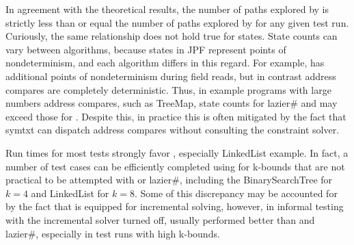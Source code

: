 In agreement with the theoretical results, the number of paths explored by \symtxt{} is strictly less than or equal the number of paths explored by \gsetxt{} for any given test run. Curiously, the same relationship does not hold true for states. State counts can vary between algorithms, because states in JPF represent points of nondeterminism, and each algorithm differs in this regard. For example, \gsetxt{} has additional points of nondeterminism during field reads, but in contrast address compares are completely deterministic. Thus, in example programs with large numbers address compares, such as TreeMap, state counts for lazier\# and \symtxt{} may exceed those for \gsetxt{}. Despite this, in practice this is often mitigated by the fact that symtxt{} can dispatch address compares without consulting the constraint solver.

Run times for most tests strongly favor \symtxt{}, especially LinkedList example. In fact, a number of test cases can be efficiently completed using \symtxt{} for k-bounds that are not practical to be attempted with \gsetxt{} or lazier\#, including the BinarySearchTree for $k=4$ and LinkedList for $k=8$. Some of this discrepancy may be accounted for by the fact that \symtxt{} is equipped for incremental solving, however, in informal testing with the incremental solver turned off, \symtxt{} usually performed better than \gsetxt and lazier\#, especially in test runs with high k-bounds. 




